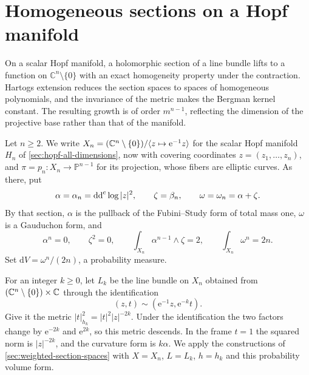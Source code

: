 \section{Homogeneous sections on a Hopf manifold}\label{sec:hopf-homogeneous-sections}

On a scalar Hopf manifold, a holomorphic section of a line bundle lifts to a function on $\mathbb C^n\setminus\{0\}$ with an exact homogeneity property under the contraction. Hartogs extension reduces the section spaces to spaces of homogeneous polynomials, and the invariance of the metric makes the Bergman kernel constant. The resulting growth is of order $m^{n-1}$, reflecting the dimension of the projective base rather than that of the manifold.

Let $n\geq2$. We write $X_n=(\mathbb C^n\setminus\{0\})/\langle z\mapsto \mathrm{e}^{-1}z\rangle$ for the scalar Hopf manifold $H_n$ of \cref{sec:hopf-all-dimensions}, now with covering coordinates $z=(z_1,\ldots,z_n)$, and $\pi=p_n\colon X_n\to\mathbb P^{n-1}$ for its projection, whose fibers are elliptic curves. As there, put
\[
 \alpha=\alpha_n=\mathrm{dd}^{\mathrm{c}}\log|z|^2,\qquad \zeta=\beta_n,\qquad \omega=\omega_n=\alpha+\zeta.
\]
By that section, $\alpha$ is the pullback of the Fubini--Study form of total mass one, $\omega$ is a Gauduchon form, and
\[
 \alpha^n=0,\qquad \zeta^2=0,\qquad
 \int_{X_n}\alpha^{n-1}\wedge\zeta=2,
 \qquad \int_{X_n}\omega^n=2n.
\]
Set $\mathrm{d}V=\omega^n/(2n)$, a probability measure.

For an integer $k\geq0$, let $L_k$ be the line bundle on $X_n$ obtained from $(\mathbb C^n\setminus\{0\})\times\mathbb C$ through the identification
\[
 (z,t)\sim(\mathrm{e}^{-1}z,\mathrm{e}^{-k}t).
\]
Give it the metric $|t|_{h_k}^2=|t|^2|z|^{-2k}$. Under the identification the two factors change by $\mathrm{e}^{-2k}$ and $\mathrm{e}^{2k}$, so this metric descends. In the frame $t=1$ the squared norm is $|z|^{-2k}$, and the curvature form is $k\alpha$. We apply the constructions of \cref{sec:weighted-section-spaces} with $X=X_n$, $L=L_k$, $h=h_k$ and this probability volume form.

